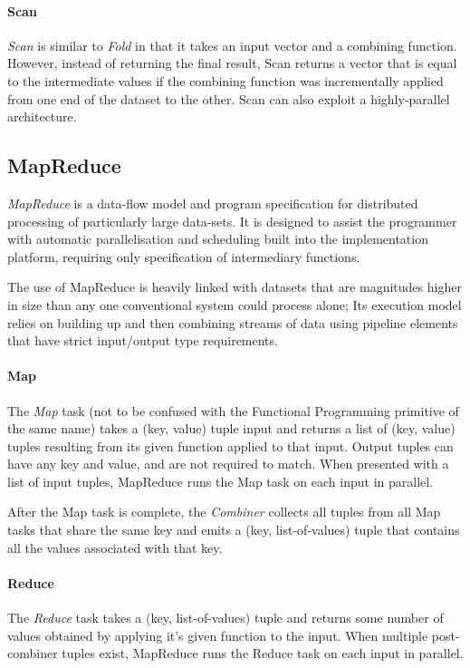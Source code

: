 \paragraph{Scan}
\emph{Scan} is similar to \emph{Fold} in that it takes an input vector and a combining function. However, instead of returning the final result, Scan returns a vector that is equal to the intermediate values if the combining function was incrementally applied from one end of the dataset to the other. Scan can also exploit a highly-parallel architecture.
\subsection{MapReduce}
\emph{MapReduce} is a data-flow model and program specification for distributed processing of particularly large data-sets\cite{mapreduce}. It is designed to assist the programmer with automatic parallelisation and scheduling built into the implementation platform, requiring only specification of intermediary functions.

The use of MapReduce is heavily linked with datasets that are magnitudes higher in size than any one conventional system could process alone; Its execution model relies on building up and then combining streams of data using pipeline elements that have strict input/output type requirements.
\paragraph{Map}
The \emph{Map} task (not to be confused with the Functional Programming primitive of the same name) takes a (key, value) tuple input and returns a list of (key, value) tuples resulting from its given function applied to that input. Output tuples can have any key and value, and are not required to match. When presented with a list of input tuples, MapReduce runs the Map task on each input in parallel.

After the Map task is complete, the \emph{Combiner} collects all tuples from all Map tasks that share the same key and emits a (key, list-of-values) tuple that contains all the values associated with that key.
\paragraph{Reduce}
The \emph{Reduce} task takes a (key, list-of-values) tuple and returns some number of values obtained by applying it's given function to the input. When multiple post-combiner tuples exist, MapReduce runs the Reduce task on each input in parallel.

